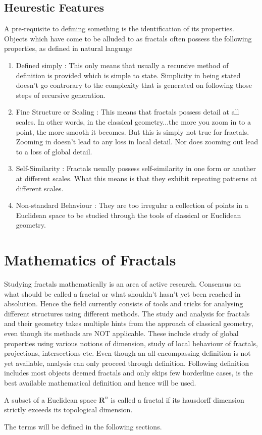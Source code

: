 \subsection{Heurestic Features}
A pre-requisite to defining something is the identification of its properties.
Objects which have come to be alluded to as fractals often possess the following
properties, as defined in natural language
\begin{enumerate}
    \item Defined simply : This only means that usually a recursive method of
        definition is provided which is simple to state. Simplicity in being
        stated doesn't go controrary to the complexity that is generated on
        following those steps of recursive generation.
    \item Fine Structure or Scaling : This means that fractals possess detail at
        all
        scales. In other words, in the classical geometry...the more you zoom in
        to a point, the more smooth it becomes. But this is simply not true for
        fractals. Zooming in doesn't lead to any loss in local detail. Nor does
        zooming out lead to a loss of global detail.
    \item Self-Similarity : Fractals usually possess self-similarity in one form
        or another at different scales. What this means is that they exhibit
        repeating patterns at different scales.
    \item Non-standard Behaviour : 
        They are too irregular a collection of points in a Euclidean space to
        be studied through the tools of classical or Euclidean geometry.
\end{enumerate}


\section{Mathematics of Fractals}
Studying fractals mathematically is an area of active research. Consensus on
what should be called a fractal or what shouldn't hasn't yet been reached in
absolution. Hence the field currently consists of tools and tricks for analysing
different structures using different methods.
\newline The study and analysis for fractals and their geometry
takes multiple hints from the
approach of classical geometry, even though its methods are NOT applicable.
These include study of global properties using various notions of dimension,
study of local behaviour of fractals, projections, intersections etc.
\newline Even though an all encompassing definition is not yet available,
analysis can only proceed through definition. Following definition includes most
objects deemed fractals and only skips few borderline cases, is the best
available mathematical definition and hence will be used.
\begin{definition}
    A subset of a Euclidean space $\bm{R}^n$ is called a fractal if its
    hausdorff dimension strictly exceeds its topological dimension.
\end{definition}
The terms will be defined in the following sections.

